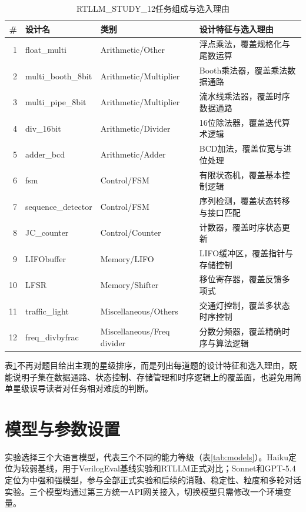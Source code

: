 \begin{table}[htbp]
\centering
\caption{RTLLM\_STUDY\_12任务组成与选入理由}
\label{tab:study12}
\begin{tabular}{rllp{5.6cm}}
\toprule
\# & 设计名 & 类别 & 设计特征与选入理由 \\
\midrule
1 & float\_multi & Arithmetic/Other & 浮点乘法，覆盖规格化与尾数运算 \\
2 & multi\_booth\_8bit & Arithmetic/Multiplier & Booth乘法器，覆盖乘法数据通路 \\
3 & multi\_pipe\_8bit & Arithmetic/Multiplier & 流水线乘法器，覆盖时序数据通路 \\
4 & div\_16bit & Arithmetic/Divider & 16位除法器，覆盖迭代算术逻辑 \\
5 & adder\_bcd & Arithmetic/Adder & BCD加法，覆盖位宽与进位处理 \\
6 & fsm & Control/FSM & 有限状态机，覆盖基本控制逻辑 \\
7 & sequence\_detector & Control/FSM & 序列检测，覆盖状态转移与接口匹配 \\
8 & JC\_counter & Control/Counter & 计数器，覆盖时序状态更新 \\
9 & LIFObuffer & Memory/LIFO & LIFO缓冲区，覆盖指针与存储控制 \\
10 & LFSR & Memory/Shifter & 移位寄存器，覆盖反馈多项式 \\
11 & traffic\_light & Miscellaneous/Others & 交通灯控制，覆盖多状态时序控制 \\
12 & freq\_divbyfrac & Miscellaneous/Freq divider & 分数分频器，覆盖精确时序与算法逻辑 \\
\bottomrule
\end{tabular}
\end{table}

表\ref{tab:study12}不再对题目给出主观的星级排序，而是列出每道题的设计特征和选入理由，既能说明子集在数据通路、状态控制、存储管理和时序逻辑上的覆盖面，也避免用简单星级误导读者对任务相对难度的判断。

\section{模型与参数设置}

实验选择三个大语言模型，代表三个不同的能力等级（表\ref{tab:models}）。Haiku定位为较弱基线，用于VerilogEval基线实验和RTLLM正式对比；Sonnet和GPT-5.4定位为中强和强模型，参与全部正式实验和后续的消融、稳定性、粒度和多轮对话实验。三个模型均通过第三方统一API网关接入，切换模型只需修改一个环境变量。

